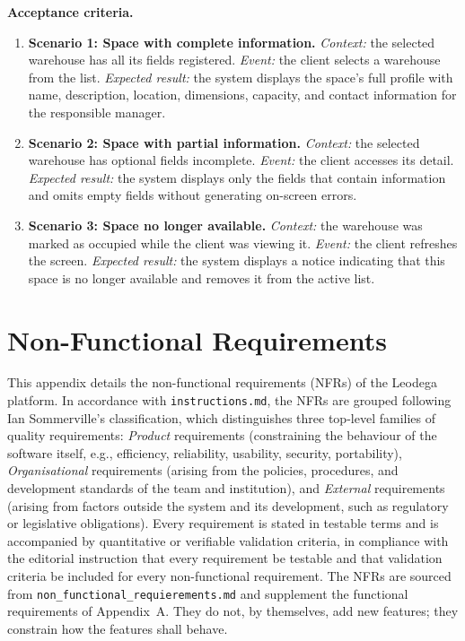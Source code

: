 \documentclass[11pt,a4paper,oneside]{report}
\begin{document}
\textbf{Acceptance criteria.}
\begin{enumerate}
\item \textbf{Scenario 1: Space with complete information.} \emph{Context:} the selected warehouse has all its fields registered. \emph{Event:} the client selects a warehouse from the list. \emph{Expected result:} the system displays the space's full profile with name, description, location, dimensions, capacity, and contact information for the responsible manager.
\item \textbf{Scenario 2: Space with partial information.} \emph{Context:} the selected warehouse has optional fields incomplete. \emph{Event:} the client accesses its detail. \emph{Expected result:} the system displays only the fields that contain information and omits empty fields without generating on-screen errors.
\item \textbf{Scenario 3: Space no longer available.} \emph{Context:} the warehouse was marked as occupied while the client was viewing it. \emph{Event:} the client refreshes the screen. \emph{Expected result:} the system displays a notice indicating that this space is no longer available and removes it from the active list.
\end{enumerate}

\chapter{Non-Functional Requirements}
\label{app:non-functional-requirements}

This appendix details the non-functional requirements (NFRs) of the Leodega platform. In accordance with \texttt{instructions.md}, the NFRs are grouped following Ian Sommerville's classification, which distinguishes three top-level families of quality requirements: \emph{Product} requirements (constraining the behaviour of the software itself, e.g., efficiency, reliability, usability, security, portability), \emph{Organisational} requirements (arising from the policies, procedures, and development standards of the team and institution), and \emph{External} requirements (arising from factors outside the system and its development, such as regulatory or legislative obligations). Every requirement is stated in testable terms and is accompanied by quantitative or verifiable validation criteria, in compliance with the editorial instruction that every requirement be testable and that validation criteria be included for every non-functional requirement. The NFRs are sourced from \texttt{non\_functional\_requierements.md} and supplement the functional requirements of Appendix~A. They do not, by themselves, add new features; they constrain how the features shall behave.
\end{document}
